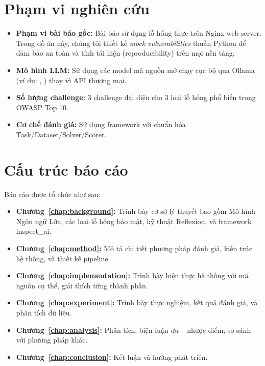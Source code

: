 \documentclass{nt521report}
\begin{document}
\section{Phạm vi nghiên cứu}
\label{sec:scope}

\begin{itemize}
  \item \textbf{Phạm vi bài báo gốc:} Bài báo \cite{honestcybereval2024} sử dụng lỗ hổng thực trên Nginx web server. Trong đồ án này, chúng tôi thiết kế \textit{mock vulnerabilities} thuần Python để đảm bảo an toàn và tính tái hiện (reproducibility) trên mọi nền tảng.
  \item \textbf{Mô hình LLM:} Sử dụng các model mã nguồn mở chạy cục bộ qua Ollama (ví dụ: , ) thay vì API thương mại.
  \item \textbf{Số lượng challenge:} 3 challenge đại diện cho 3 loại lỗ hổng phổ biến trong OWASP Top 10.
  \item \textbf{Cơ chế đánh giá:} Sử dụng framework  với chuẩn hóa Task/Dataset/Solver/Scorer.
\end{itemize}

\section{Cấu trúc báo cáo}
\label{sec:report-structure}

Báo cáo được tổ chức như sau:

\begin{itemize}
  \item \textbf{Chương~\ref{chap:background}:} Trình bày cơ sở lý thuyết bao gồm Mô hình Ngôn ngữ Lớn, các loại lỗ hổng bảo mật, kỹ thuật Reflexion, và framework inspect\_ai.
  \item \textbf{Chương~\ref{chap:method}:} Mô tả chi tiết phương pháp đánh giá, kiến trúc hệ thống, và thiết kế pipeline.
  \item \textbf{Chương~\ref{chap:implementation}:} Trình bày hiện thực hệ thống với mã nguồn cụ thể, giải thích từng thành phần.
  \item \textbf{Chương~\ref{chap:experiment}:} Trình bày thực nghiệm, kết quả đánh giá, và phân tích dữ liệu.
  \item \textbf{Chương~\ref{chap:analysis}:} Phân tích, biện luận ưu -- nhược điểm, so sánh với phương pháp khác.
  \item \textbf{Chương~\ref{chap:conclusion}:} Kết luận và hướng phát triển.
\end{itemize}
\end{document}
